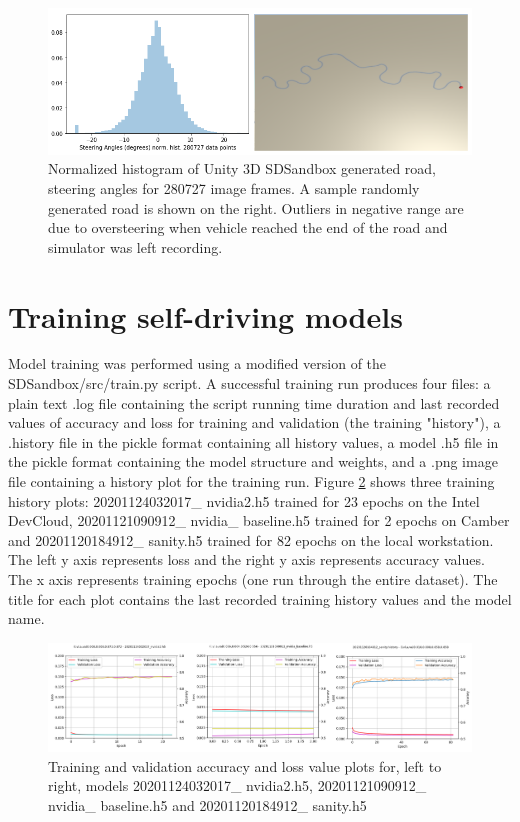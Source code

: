 \begin{figure}[ht]
 \centering 
 \includegraphics[width=\textwidth]{Figures/GeneratedRoadPlusHistogram.png}
 \caption{Normalized histogram of Unity 3D SDSandbox generated road, steering angles for 280727 image frames. A sample randomly generated road is shown on the right. Outliers in negative range are due to oversteering when vehicle reached the end of the road and simulator was left recording.}
 \label{fig:GeneratedRoadPlusHist}
\end{figure}

\section{Training self-driving models}
Model training was performed using a modified version of the SDSandbox/src/train.py script. A successful training run produces four files: a plain text .log file containing the script running time duration and last recorded values of accuracy and loss for training and validation (the training "history"), a .history file in the pickle format containing all history values, a model .h5 file in the pickle format containing the model structure and weights, and a .png image file containing a history plot for the training run.
Figure \ref{fig:devcloud_nvidia2__camber_baseline_local_sanity_accuracy} shows three training history plots: 20201124032017\_ nvidia2.h5 trained for 23 epochs on the Intel DevCloud, 20201121090912\_ nvidia\_ baseline.h5 trained for 2 epochs on Camber and 20201120184912\_ sanity.h5 trained for 82 epochs on the local workstation. The left y axis represents loss and the right y axis represents accuracy values. The x axis represents training epochs (one run through the entire dataset). The title for each plot contains the last recorded training history values and the model name.
\begin{figure}[ht]
 \centering 
 \includegraphics[width=\textwidth]{Figures/devcloud_nvidia2__camber_baseline_local_sanity_accuracy.png}
 \caption{Training and validation accuracy and loss value plots for, left to right, models 20201124032017\_ nvidia2.h5, 20201121090912\_ nvidia\_ baseline.h5 and 20201120184912\_ sanity.h5}
 \label{fig:devcloud_nvidia2__camber_baseline_local_sanity_accuracy}
\end{figure}

